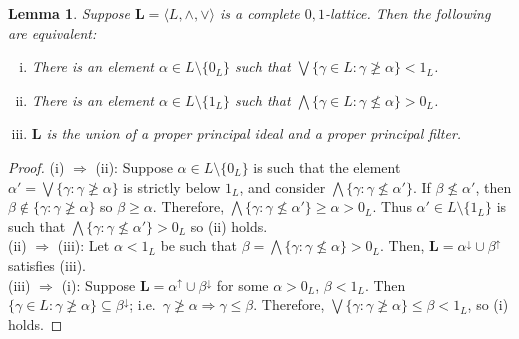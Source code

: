 \documentclass[cm,dissertation,actual,final]{uhthesis}
\theoremstyle{plain}
\newtheorem{lemma}[theorem]{Lemma}
\theoremstyle{definition}
\theoremstyle{remark}
\numberwithin{theorem}{section}
\numberwithin{claim}{chapter}
\numberwithin{equation}{section}
\numberwithin{conjecture}{chapter}
\newcommand{\<}{\ensuremath{\langle}}
\renewcommand{\>}{\ensuremath{\rangle}}
\renewcommand{\leq}{\ensuremath{\leqslant}}
\renewcommand{\nleq}{\ensuremath{\nleqslant}}
\renewcommand{\geq}{\ensuremath{\geqslant}}
\renewcommand{\ngeq}{\ensuremath{\ngeqslant}}
\newcommand{\meet}{\ensuremath{\wedge}}
\newcommand{\join}{\ensuremath{\vee}}
\newcommand{\0}{\ensuremath{\mathbf{0}}}
\newcommand{\1}{\ensuremath{\mathbf{1}}}
\newcommand{\2}{\ensuremath{\mathbf{2}}}
\newcommand{\3}{\ensuremath{\mathbf{3}}}
\newcommand{\4}{\ensuremath{\mathbf{4}}}
\newcommand{\5}{\ensuremath{\mathbf{5}}}
\newcommand{\bL}{\ensuremath{\mathbf{L}}}
\newcommand{\upalpha}{\ensuremath{\alpha^{\uparrow}}}
\newcommand{\downalpha}{\ensuremath{\alpha^{\downarrow}}}
\newcommand{\upbeta}{\ensuremath{\beta^{\uparrow}}}
\newcommand{\downbeta}{\ensuremath{\beta^{\downarrow}}}
\begin{document}
\begin{lemma}
\label{Concrete-lemma-1}
Suppose $\bL = \langle L, \meet, \join\rangle$ is a complete $0,1$-lattice. Then the following
are equivalent:
\begin{enumerate}[(i)]
\item There is an element 
$\alpha \in L \setminus \{0_L\}$
such that $\bigvee\{\gamma\in L: \gamma \ngeq \alpha \} < 1_L$.
\item There is an element $\alpha \in L \setminus \{1_L\}$ such that $\bigwedge\{\gamma\in L:
  \gamma \nleq \alpha \} > 0_L$.
\item $\bL$ is the union of a proper principal ideal and a proper principal filter.
\end{enumerate}
\end{lemma}
\begin{proof}
(i) $\Rightarrow$ (ii): Suppose $\alpha \in L \setminus \{0_L\}$ is such that the element
$\alpha' = \bigvee\{\gamma: \gamma \ngeq \alpha \}$ is strictly below $1_L$, and 
consider $\bigwedge\{\gamma: \gamma \nleq \alpha'\}$.  If $\beta \nleq \alpha'$, then
$\beta \notin \{\gamma: \gamma \ngeq \alpha \}$ so $\beta \geq \alpha$.  Therefore,
$\bigwedge\{\gamma: \gamma \nleq \alpha'\}\geq \alpha > 0_L$.  Thus $\alpha'\in
L\setminus \{1_L\}$ is such that 
$\bigwedge\{\gamma: \gamma \nleq \alpha'\}> 0_L$ so (ii) holds.\\[4pt]
(ii) $\Rightarrow$ (iii): Let $\alpha < 1_L$ be such that $\beta = \bigwedge
\{\gamma: \gamma\nleq  \alpha\} > 0_L$.  
Then, $\bL = \downalpha \cup \upbeta$ satisfies (iii).\\[4pt]
(iii) $\Rightarrow$ (i): Suppose 
 $\bL = \upalpha \cup \downbeta$ for some $\alpha > 0_L$,  $\beta < 1_L$.
 Then $\{\gamma\in L: \gamma \ngeq \alpha\} \subseteq \downbeta$; 
i.e.~$\gamma \ngeq \alpha \Rightarrow \gamma \leq \beta$.  Therefore,
 $\bigvee \{\gamma: \gamma\ngeq \alpha \} \leq \beta < 1_L$, so (i) holds.
\end{proof}
\end{document}
